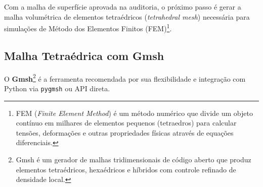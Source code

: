 Com a malha de superfície aprovada na auditoria, o próximo passo é
gerar a malha volumétrica de elementos tetraédricos
(\textit{tetrahedral mesh}) necessária para simulações de Método dos
Elementos Finitos (FEM)\footnote{FEM (\textit{Finite Element Method})
é um método numérico que divide um objeto contínuo em milhares de
elementos pequenos (tetraedros) para calcular tensões, deformações e
outras propriedades físicas através de equações diferenciais.}.

\subsection{Malha Tetraédrica com Gmsh}

O \textbf{Gmsh}\footnote{Gmsh é um gerador de malhas tridimensionais
de código aberto que produz elementos tetraédricos, hexaédricos e
híbridos com controle refinado de densidade local.} é a ferramenta
recomendada por sua flexibilidade e integração com Python via
\texttt{pygmsh} ou API direta.

